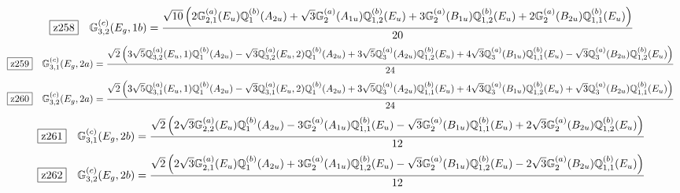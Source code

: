 \documentclass[fleqn,10pt,landscape]{jsarticle}
\begin{document}
\begin{dmath*}
\hspace*{3mm}\fbox{z258}\quad \mathbb{G}_{3,2}^{(c)}(E_{g},1b)=\frac{\sqrt{10} \left(2 \mathbb{G}_{2,1}^{(a)}(E_{u}) \mathbb{Q}_{1}^{(b)}(A_{2u}) + \sqrt{3} \mathbb{G}_{2}^{(a)}(A_{1u}) \mathbb{Q}_{1,2}^{(b)}(E_{u}) + 3 \mathbb{G}_{2}^{(a)}(B_{1u}) \mathbb{Q}_{1,2}^{(b)}(E_{u}) + 2 \mathbb{G}_{2}^{(a)}(B_{2u}) \mathbb{Q}_{1,1}^{(b)}(E_{u})\right)}{20}
\end{dmath*}
\begin{dmath*}
\hspace*{3mm}\fbox{z259}\quad \mathbb{G}_{3,1}^{(c)}(E_{g},2a)=\frac{\sqrt{2} \left(3 \sqrt{5} \mathbb{Q}_{3,2}^{(a)}(E_{u},1) \mathbb{Q}_{1}^{(b)}(A_{2u}) - \sqrt{3} \mathbb{Q}_{3,2}^{(a)}(E_{u},2) \mathbb{Q}_{1}^{(b)}(A_{2u}) + 3 \sqrt{5} \mathbb{Q}_{3}^{(a)}(A_{2u}) \mathbb{Q}_{1,2}^{(b)}(E_{u}) + 4 \sqrt{3} \mathbb{Q}_{3}^{(a)}(B_{1u}) \mathbb{Q}_{1,1}^{(b)}(E_{u}) - \sqrt{3} \mathbb{Q}_{3}^{(a)}(B_{2u}) \mathbb{Q}_{1,2}^{(b)}(E_{u})\right)}{24}
\end{dmath*}
\begin{dmath*}
\hspace*{3mm}\fbox{z260}\quad \mathbb{G}_{3,2}^{(c)}(E_{g},2a)=\frac{\sqrt{2} \left(3 \sqrt{5} \mathbb{Q}_{3,1}^{(a)}(E_{u},1) \mathbb{Q}_{1}^{(b)}(A_{2u}) - \sqrt{3} \mathbb{Q}_{3,1}^{(a)}(E_{u},2) \mathbb{Q}_{1}^{(b)}(A_{2u}) + 3 \sqrt{5} \mathbb{Q}_{3}^{(a)}(A_{2u}) \mathbb{Q}_{1,1}^{(b)}(E_{u}) + 4 \sqrt{3} \mathbb{Q}_{3}^{(a)}(B_{1u}) \mathbb{Q}_{1,2}^{(b)}(E_{u}) + \sqrt{3} \mathbb{Q}_{3}^{(a)}(B_{2u}) \mathbb{Q}_{1,1}^{(b)}(E_{u})\right)}{24}
\end{dmath*}
\begin{dmath*}
\hspace*{3mm}\fbox{z261}\quad \mathbb{G}_{3,1}^{(c)}(E_{g},2b)=\frac{\sqrt{2} \left(2 \sqrt{3} \mathbb{G}_{2,2}^{(a)}(E_{u}) \mathbb{Q}_{1}^{(b)}(A_{2u}) - 3 \mathbb{G}_{2}^{(a)}(A_{1u}) \mathbb{Q}_{1,1}^{(b)}(E_{u}) - \sqrt{3} \mathbb{G}_{2}^{(a)}(B_{1u}) \mathbb{Q}_{1,1}^{(b)}(E_{u}) + 2 \sqrt{3} \mathbb{G}_{2}^{(a)}(B_{2u}) \mathbb{Q}_{1,2}^{(b)}(E_{u})\right)}{12}
\end{dmath*}
\begin{dmath*}
\hspace*{3mm}\fbox{z262}\quad \mathbb{G}_{3,2}^{(c)}(E_{g},2b)=\frac{\sqrt{2} \left(2 \sqrt{3} \mathbb{G}_{2,1}^{(a)}(E_{u}) \mathbb{Q}_{1}^{(b)}(A_{2u}) + 3 \mathbb{G}_{2}^{(a)}(A_{1u}) \mathbb{Q}_{1,2}^{(b)}(E_{u}) - \sqrt{3} \mathbb{G}_{2}^{(a)}(B_{1u}) \mathbb{Q}_{1,2}^{(b)}(E_{u}) - 2 \sqrt{3} \mathbb{G}_{2}^{(a)}(B_{2u}) \mathbb{Q}_{1,1}^{(b)}(E_{u})\right)}{12}
\end{dmath*}
\end{document}
